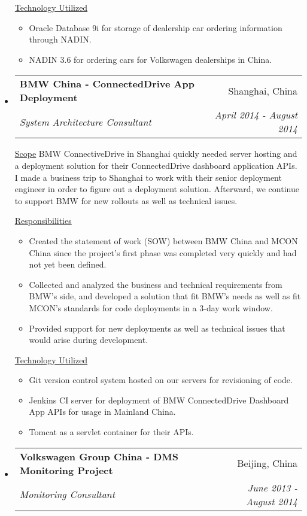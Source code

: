 \documentclass[a4paper,11pt]{article}
\makeatletter
\newcommand{\resitem}[1]{\item #1 \vspace{-2pt}}
\newcommand{\ressubheading}[4]{
\begin{tabular*}{6.5in}{l@{\cftdotfill{\cftsecdotsep}\extracolsep{\fill}}r}
		\textbf{#1} & #2 \\
		\textit{#3} & \textit{#4} \\
\end{tabular*}\vspace{-6pt}}
\makeatother
\begin{document}
\begin{itemize}
		\underline{Technology Utilized}
		\begin{itemize}
			\resitem{Oracle Database 9i for storage of dealership car ordering information through NADIN.}
			\resitem{NADIN 3.6 for ordering cars for Volkswagen dealerships in China.}
		\end{itemize}

	\item
		\ressubheading{BMW China - ConnectedDrive App Deployment}{Shanghai, China}{System Architecture Consultant}{April 2014 - August 2014}
		\linebreak
		\linebreak

		\underline{Scope}
		\linebreak
		\linebreak
		BMW ConnectiveDrive in Shanghai quickly needed server hosting and a deployment solution for their ConnectedDrive dashboard application APIs. I made a business trip to Shanghai to work with their senior deployment engineer in order to figure out a deployment solution. Afterward, we continue to support BMW for new rollouts as well as technical issues.

		\underline{Responsibilities}
		\begin{itemize}
			\resitem{Created the statement of work (SOW) between BMW China and MCON China since the project's first phase was completed very quickly and had not yet been defined.}
			\resitem{Collected and analyzed the business and technical requirements from BMW's side, and developed a solution that fit BMW's needs as well as fit MCON's standards for code deployments in a 3-day work window.}
			\resitem{Provided support for new deployments as well as technical issues that would arise during development.}
		\end{itemize}

		\underline{Technology Utilized}
		\begin{itemize}
			\resitem{Git version control system hosted on our servers for revisioning of code.}
			\resitem{Jenkins CI server for deployment of BMW ConnectedDrive Dashboard App APIs for usage in Mainland China.}
			\resitem{Tomcat as a servlet container for their APIs.}
		\end{itemize}

	\item
		\ressubheading{Volkswagen Group China - DMS Monitoring Project}{Beijing, China}{Monitoring Consultant}{June 2013 - August 2014}
		\linebreak
		\linebreak


\end{itemize}
\end{document}
